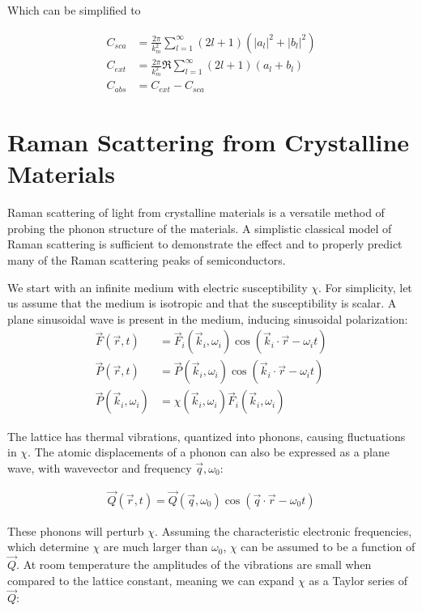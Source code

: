         Which can be simplified to

        \begin{align}
            C_{sca} &= \frac{2\pi}{k^2_m}\sum_{l=1}^\infty (2l +1)(|a_l|^2 + |b_l|^2)\\
            C_{ext} &= \frac{2\pi}{k^2_m}\Re\sum_{l=1}^\infty (2l +1)(a_l + b_l)\\
            C_{abs} &= C_{ext} - C_{sca}
        \end{align}

\clearpage

\section{Raman Scattering from Crystalline Materials}
\label{ap:Raman}
    Raman scattering of light from crystalline materials is a versatile method of probing the phonon structure of the materials.
    A simplistic classical model of Raman scattering is sufficient to demonstrate the effect and to properly predict many of the
    Raman scattering peaks of semiconductors\cite{peter2010fundamentals}.

    We start with an infinite medium with electric susceptibility $\chi$. For simplicity, let us assume that the medium is isotropic
    and that the susceptibility is scalar. A plane sinusoidal wave is present in the medium, inducing sinusoidal polarization:
    \begin{align}
        \vec{F}(\vec{r}, t) &= \vec{F}_i(\vec{k}_i, \omega_i)\cos(\vec{k}_i\cdot\vec{r} - \omega_i t) \\
        \vec{P}(\vec{r}, t) &= \vec{P}(\vec{k}_i, \omega_i)\cos(\vec{k}_i\cdot\vec{r} - \omega_i t) \\
        \vec{P}(\vec{k}_i, \omega_i) &= \chi(\vec{k}_i, \omega_i)\vec{F}_i(\vec{k}_i, \omega_i)
    \end{align}

    The lattice has thermal vibrations, quantized into phonons, causing fluctuations in $\chi$. The atomic displacements of a phonon
    can also be expressed as a plane wave, with wavevector and frequency $\vec{q}, \omega_0$:

    \begin{align}
        \vec{Q}(\vec{r}, t) = \vec{Q}(\vec{q},\omega_0)\cos(\vec{q}\cdot\vec{r}-\omega_0 t)
    \end{align}

    These phonons will perturb $\chi$. Assuming the characteristic electronic frequencies, which determine $\chi$ are
    much larger than $\omega_0$, $\chi$ can be assumed to be a function of $\vec{Q}$. At room temperature the
    amplitudes of the vibrations are small when compared to the lattice constant, meaning we can expand $\chi$ as
    a Taylor series of $\vec{Q}$:

